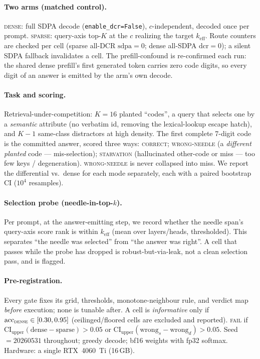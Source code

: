 \documentclass[11pt]{article}
\newcommand{\keff}{k_{\mathrm{eff}}}
\begin{document}
\paragraph{Two arms (matched control).}
\textsc{dense}: full SDPA decode (\texttt{enable\_dcr=False}), $c$-independent,
decoded once per prompt. \textsc{sparse}: query-axis top-$K$ at the $c$ realizing
the target $\keff$. Route counters are checked per cell (sparse all-DCR
$\text{sdpa}=0$; dense all-SDPA $\text{dcr}=0$); a silent SDPA fallback invalidates
a cell. The prefill-confound is re-confirmed each run: the shared dense prefill's
first generated token carries zero code digits, so every digit of an answer is
emitted by the arm's own decode.

\paragraph{Task and scoring.}
Retrieval-under-competition: $K{=}16$ planted ``codes'', a query that selects one by
a \emph{semantic} attribute (no verbatim id, removing the lexical-lookup escape
hatch), and $K{-}1$ same-class distractors at high density. The first complete
7-digit code is the committed answer, scored three ways:
\textsc{correct}; \textsc{wrong-needle} (a \emph{different planted} code ---
mis-selection); \textsc{starvation} (hallucinated other-code or miss --- too few
keys / degeneration). \textsc{wrong-needle} is never collapsed into miss. We report
the differential vs.\ dense for each mode separately, each with a paired bootstrap
CI ($10^4$ resamples).

\paragraph{Selection probe (needle-in-top-$k$).}
Per prompt, at the answer-emitting step, we record whether the needle span's
query-axis score rank is within $\keff$ (mean over layers/heads, thresholded). This
separates ``the needle was selected'' from ``the answer was right''. A cell that
passes while the probe has dropped is robust-but-via-leak, not a clean selection
pass, and is flagged.

\paragraph{Pre-registration.}
Every gate fixes its grid, thresholds, monotone-neighbour rule, and verdict map
\emph{before} execution; none is tunable after. A cell is \emph{informative} only if
$\mathrm{acc}_{\textsc{dense}}\in[0.30,0.95]$ (ceilinged/floored cells are excluded
and reported). \textsc{fail} if $\mathrm{CI}_{\text{upper}}(\text{dense}-\text{sparse})>0.05$
or $\mathrm{CI}_{\text{upper}}(\text{wrong}_s-\text{wrong}_d)>0.05$. Seed $=20260531$
throughout; greedy decode; bf16 weights with fp32 softmax. Hardware: a single
RTX~4060~Ti (16\,GB).
\end{document}
